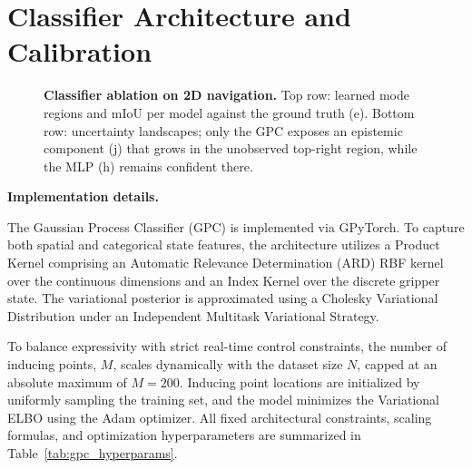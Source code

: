 \appendices
\section{Classifier Architecture and Calibration}
\label{app:ablation}
\begin{figure}[t]
\centering

\caption{\textbf{Classifier ablation on 2D navigation.} Top row: learned mode regions and mIoU per model against the ground truth (e). Bottom row: uncertainty landscapes; only the GPC exposes an epistemic component (j) that grows in the unobserved top-right region, while the MLP (h) remains confident there.}
\label{fig:ablation}
\end{figure}
\textbf{Implementation details.}

The Gaussian Process Classifier (GPC) is implemented via GPyTorch. To capture both spatial and categorical state features, the architecture utilizes a Product Kernel comprising an Automatic Relevance Determination (ARD) RBF kernel over the continuous dimensions and an Index Kernel over the discrete gripper state. The variational posterior is approximated using a Cholesky Variational Distribution under an Independent Multitask Variational Strategy.

To balance expressivity with strict real-time control constraints, the number of inducing points, $M$, scales dynamically with the dataset size $N$, capped at an absolute maximum of $M=200$. Inducing point locations are initialized by uniformly sampling the training set, and the model minimizes the Variational ELBO using the Adam optimizer. All fixed architectural constraints, scaling formulas, and optimization hyperparameters are summarized in Table~\ref{tab:gpc_hyperparams}.

